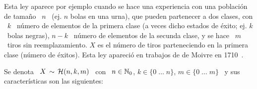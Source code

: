 \label{Sssec:MP:Hipergeometrica}

Esta ley aparece por ejemplo cuando  se hace una experiencia con una poblaci\'on
de tama\~no \  $n$ \ (ej.  $n$ bolas  en una urna), que pueden  partenecer a dos
clases, con  \ $k$ \ n\'umero  de elementos de  la primera clase (a  veces dicho
estados de \'exito; ej. $k$ \ bolas  negras), $n-k$ \ n\'umero de elementos de la
secunda clase, y se  hace \ $m$ \ tiros sin reemplazamiento.   $X$ es el n\'umero
de  tiros parteneciendo  en la  primera clase  (n\'umero de  \'exitos).  Esta ley
apareci\'o en trabajos de de Moivre en 1710~\cite{Moi10, Hal90, DavEdw01}.

Se denota \ $X \, \sim \, \mathcal{H}(n,k,m)$ \  con \ $n \in \mathbb{N}_0$, \quad $k \in \{ 0
\;  \ldots  \;  n  \}$,  \quad  $m  \in  \{  0 \;  \ldots  \;  m  \}$  \  y  sus
caracter\'isticas son las siguientes:

